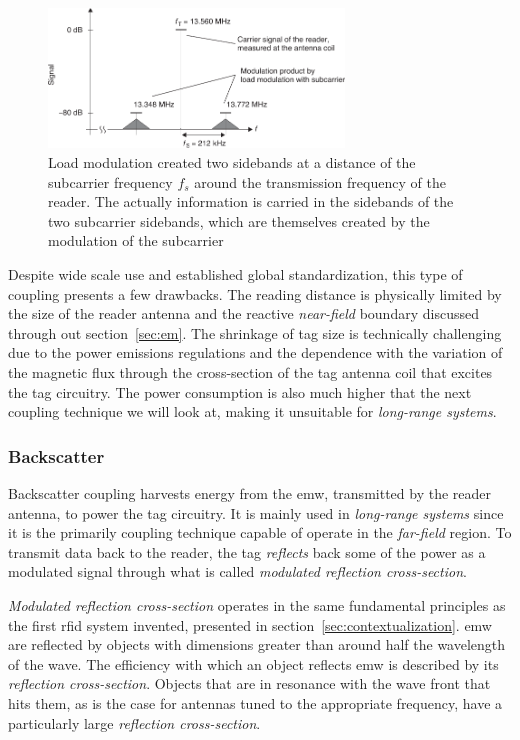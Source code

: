 \begin{figure}[!ht]
    \centering
    \includegraphics[width=0.7\textwidth]{./figs/02-state-of-the-art/loadmodulation_sidebands.pdf}
    \caption{Load modulation created two sidebands at a distance of the subcarrier frequency $f_s$ around the transmission frequency of the reader. The actually information is carried in the sidebands of the two subcarrier sidebands, which are themselves created by the modulation of the subcarrier ~\cite{finkenzellerRFIDHandbookFundamentals2003}} 
    \label{fig:loadmodulationsidebands}
\end{figure}

Despite wide scale use and established global standardization, this type of coupling presents a few drawbacks. The reading distance is physically limited by the size of the reader antenna and the reactive \emph{near-field} boundary discussed through out section~\ref{sec:em}. The shrinkage of tag size is technically challenging due to the power emissions regulations and the dependence with the variation of the magnetic flux through the cross-section of the tag antenna coil that excites the tag circuitry. The power consumption is also much higher that the next coupling technique we will look at, making it unsuitable for \emph{long-range systems}.  

\subsubsection{Backscatter}


Backscatter coupling harvests energy from the \ac{emw}, transmitted by the reader antenna, to power the tag circuitry. It is mainly used in \emph{long-range systems} since it is the primarily coupling technique capable of operate in the \emph{far-field} region.
To transmit data back to the reader, the tag \textit{reflects} back some of the power as a modulated signal through what is called \emph{modulated reflection cross-section}.

\emph{Modulated reflection cross-section} operates in the same fundamental principles as the first \ac{rfid} system invented, presented in section~\ref{sec:contextualization}.
\ac{emw} are reflected by objects with dimensions greater than around half the wavelength of the wave.
The efficiency with which an object reflects \ac{emw} is described by its \emph{reflection cross-section}. Objects that are in resonance with the wave front that hits them, as is the case for antennas tuned to the appropriate frequency, have a particularly large \emph{reflection cross-section}.

